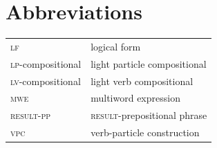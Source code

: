 \documentclass[output=paper
,modfonts
,nonflat]{langsci/langscibook}
\begin{document}
\section*{Abbreviations}

\begin{tabularx}{.96\textwidth}{ll}
\textsc{lf} & logical form  \\\textsc{lp}-compositional  & light particle compositional  \\
\textsc{lv}-compositional & light verb compositional   \\
\textsc{mwe} & multiword expression  \\
\textsc{result-pp} & \textsc{result}-prepositional phrase  \\
\textsc{vpc} & verb-particle construction \\
\end{tabularx}



{\sloppy
\printbibliography[heading=subbibliography,notkeyword=this]
}
\end{document}
